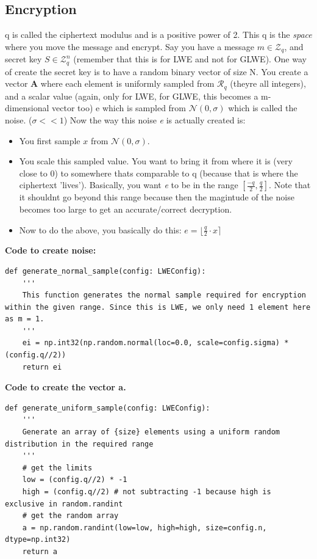 \documentclass{report}
\begin{document}
\subsection{Encryption}
q is called the ciphertext modulus and is a positive power of 2. This q is the \textit{space} where you move the message and encrypt. Say you have a message $m \in \mathcal{Z}_q$, and secret key $S \in \mathcal{Z}^n_q$ (remember that this is for LWE and not for GLWE). One way of create the secret key is to have a random binary vector of size N. You create a vector $\mathbf{A}$ where each element is uniformly sampled from $\mathcal{R}_q$ (theyre all integers), and a scalar value (again, only for LWE, for GLWE, this becomes a m-dimensional vector too) e which is sampled from $\mathcal{N}(0, \sigma)$ which is called the noise. ($\sigma << 1$)\newline
Now the way this noise \textit{e} is actually created is:
\begin{itemize}
  \item You first sample $x$ from $\mathcal{N}(0, \sigma)$.
  \item You scale this sampled value. You want to bring it from where it is (very close to 0) to somewhere thats comparable to q (because that is where the ciphertext 'lives'). Basically, you want \textit{e} to be in the range $[\frac{-q}{2}, \frac{q}{2}]$. Note that it shouldnt go beyond this range because then the magintude of the noise becomes too large to get an accurate/correct decryption.
  \item Now to do the above, you basically do this: $e = \lfloor \frac{q}{2} \cdot x \rceil$
\end{itemize}
\textbf{Code to create noise:}
\begin{verbatim}
def generate_normal_sample(config: LWEConfig):
	'''
	This function generates the normal sample required for encryption within the given range. Since this is LWE, we only need 1 element here as m = 1.
	'''
	ei = np.int32(np.random.normal(loc=0.0, scale=config.sigma) * (config.q//2))
	return ei
\end{verbatim}

\textbf{Code to create the vector a.}
\begin{verbatim}
def generate_uniform_sample(config: LWEConfig):
	'''
	Generate an array of {size} elements using a uniform random distribution in the required range
	'''
	# get the limits
	low = (config.q//2) * -1
	high = (config.q//2) # not subtracting -1 because high is exclusive in random.randint
	# get the random array
	a = np.random.randint(low=low, high=high, size=config.n, dtype=np.int32)
	return a
\end{verbatim}
\end{document}
